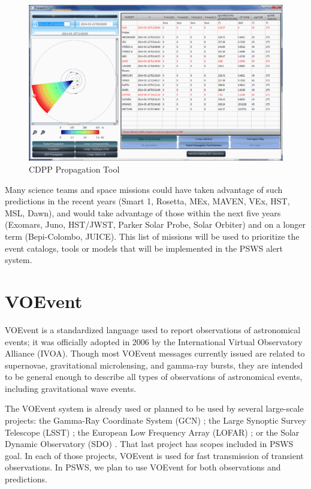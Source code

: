 \documentclass[referee,a4paper,12pt,traditabstract]{swsc}
\begin{document}
\begin{linenumbers}
\begin{figure}
\centering\includegraphics[width=\linewidth]{pasted-image-1301.pdf}
\caption{CDPP Propagation Tool}
\label{fig:cdpp-proptool}
\end{figure}

Many science teams and space missions could have taken advantage of such predictions in the recent years (Smart 1, Rosetta, MEx, MAVEN, VEx, HST, MSL, Dawn), and would take advantage of those within the next five years (Exomars, Juno, HST/JWST, Parker Solar Probe, Solar Orbiter) and on a longer term (Bepi-Colombo, JUICE). This list of missions will be used to prioritize the event catalogs, tools or models that will be implemented in the PSWS alert system.

\section{VOEvent}
VOEvent \cite{voevent} is a standardized language used to report observations of astronomical events; it was officially adopted in 2006 by the International Virtual Observatory Alliance (IVOA). Though most VOEvent messages currently issued are related to supernovae, gravitational microlensing, and gamma-ray bursts, they are intended to be general enough to describe all types of observations of astronomical events, including gravitational wave events. 

The VOEvent system is already used or planned to be used by several large-scale projects: the Gamma-Ray Coordinate System (GCN) \cite{barthelmy08}; the Large Synoptic Survey Telescope (LSST) \cite{2014htu..conf...19K}; the European Low Frequency Array (LOFAR) \cite{vanHaarlem:2013gi}; or the Solar Dynamic Observatory (SDO) \cite{Somani_AGU_2012}. That last project has scopes included in PSWS goal. In each of those projects, VOEvent is used for fast transmission of transient observations. In PSWS, we plan to use VOEvent for both observations and predictions.


\end{linenumbers}
\end{document}

